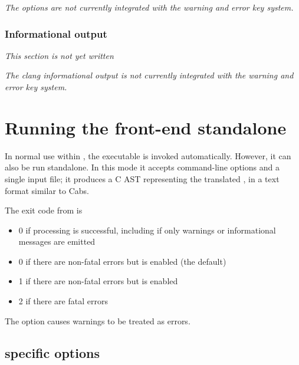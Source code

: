 \textit{The \clang options are not currently integrated with the \fc warning and error key system.}

\subsection{Informational output}

\textit{This section is not yet written}

\textit{The clang informational output is not currently integrated with the \fc warning and error key system.}

\chapter{Running the \fclang front-end standalone}
\label{sec:standalone}

In normal use within \framac, the \irg executable is
invoked automatically. However, it can also be run standalone.
In this mode it accepts command-line options and a single input file;
it produces a C AST representing the translated \cpp, in a text format similar to Cabs.

The exit code from \irg is
\begin{itemize}
\item 0 if processing is successful, including if only warnings or informational messages are emitted
\item 0 if there are non-fatal errors but  is enabled (the default)
\item 1 if there are non-fatal errors but  is enabled
\item 2 if there are fatal errors
\end{itemize}

The  \irg option causes warnings to be treated as errors.

\section{\irg specific options}
\label{sec:fcloptions}

